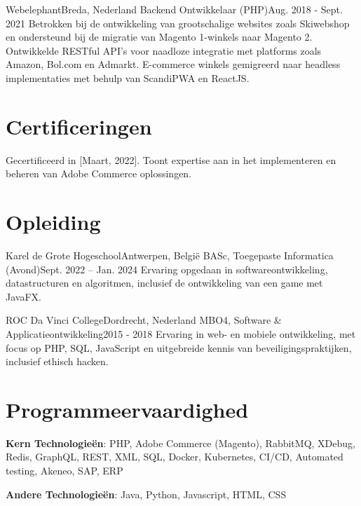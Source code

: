     \resumeSubheading
      {Webelephant}{Breda, Nederland}
      {Backend Ontwikkelaar (PHP)}{Aug. 2018 - Sept. 2021}
      \resumeItemListStart
          {Betrokken bij de ontwikkeling van grootschalige websites zoals Skiwebshop en ondersteund bij de migratie van Magento 1-winkels naar Magento 2.}
          {Ontwikkelde RESTful API's voor naadloze integratie met platforms zoals Amazon, Bol.com en Admarkt.}
          {E-commerce winkels gemigreerd naar headless implementaties met behulp van ScandiPWA en ReactJS.}
      \resumeItemListEnd
      
  \resumeSubHeadingListEnd

\section{Certificeringen}
  \resumeSubHeadingListStart
      {Gecertificeerd in [Maart, 2022]. Toont expertise aan in het implementeren en beheren van Adobe Commerce oplossingen.}
  \resumeSubHeadingListEnd

\section{Opleiding}
  \resumeSubHeadingListStart
    \resumeSubheading
      {Karel de Grote Hogeschool}{Antwerpen, België}
      {BASc, Toegepaste Informatica (Avond)}{Sept. 2022 -- Jan. 2024}
      \resumeItemListStart
          {Ervaring opgedaan in softwareontwikkeling, datastructuren en algoritmen, inclusief de ontwikkeling van een game met JavaFX.}
      \resumeItemListEnd
      
    \resumeSubheading
      {ROC Da Vinci College}{Dordrecht, Nederland}
      {MBO4, Software \& Applicatieontwikkeling}{2015 - 2018}
      \resumeItemListStart
          {Ervaring in web- en mobiele ontwikkeling, met focus op PHP, SQL, JavaScript en uitgebreide kennis van beveiligingspraktijken, inclusief ethisch hacken.}
      \resumeItemListEnd
  \resumeSubHeadingListEnd

\section{Programmeervaardighed}
 \resumeSubHeadingListStart
   \item{
     \textbf{Kern Technologieën}{: PHP, Adobe Commerce (Magento), RabbitMQ, XDebug, Redis, GraphQL, REST, XML, SQL, Docker, Kubernetes, CI/CD, Automated testing, Akeneo, SAP, ERP}
   }
   \item{
     \textbf{Andere Technologieën}{: Java, Python, Javascript, HTML, CSS}
   }
 \resumeSubHeadingListEnd

